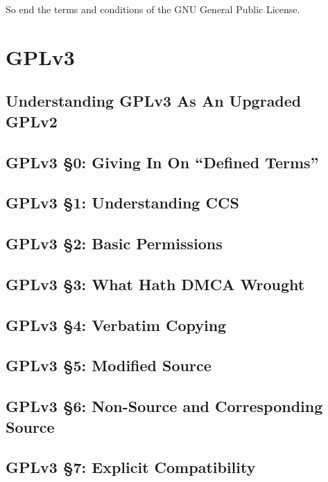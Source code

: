 So end the terms and conditions of the GNU General Public License.

\chapter{GPLv3}

\section{Understanding GPLv3 As An Upgraded GPLv2}

\section{GPLv3 \S 0: Giving In On ``Defined Terms''}

\section{GPLv3 \S 1: Understanding CCS}

\section{GPLv3 \S 2: Basic Permissions}

\section{GPLv3 \S 3: What Hath DMCA Wrought}

\section{GPLv3 \S 4: Verbatim Copying}

\section{GPLv3 \S 5: Modified Source}

\section{GPLv3 \S 6: Non-Source and Corresponding Source}

\section{GPLv3 \S 7: Explicit Compatibility}

